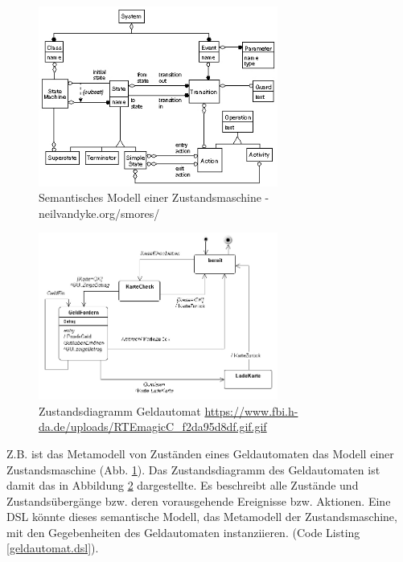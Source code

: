 \documentclass[11pt,english,ngerman, headsepline]{scrreprt}
\begin{document}
 
\begin{figure}[h!]
	\begin{center}
	\includegraphics[width=0.7\textwidth]{pics/data-model.jpg}
	\end{center}
	\caption{Semantisches Modell einer 	Zustandsmaschine
	- neilvandyke.org/smores/ }
	\label{state-machine-semantic-model}
\end{figure}

\begin{figure}[h!]
	\begin{center}
	\includegraphics[width=0.7\textwidth]{pics/zutandsdiaGeldautomat.jpg}
	\end{center}
	\caption{Zustandsdiagramm Geldautomat
	\url{https://www.fbi.h-da.de/uploads/RTEmagicC_f2da95d8df.gif.gif} }
	\label{zutandsdiaGeldautomat.jpg}
\end{figure}

Z.B. ist das Metamodell von Zuständen eines Geldautomaten das Modell einer
Zustandsmaschine (Abb. \ref{state-machine-semantic-model}). Das Zustandsdiagramm
des Geldautomaten ist damit das in Abbildung \ref{zutandsdiaGeldautomat.jpg}
dargestellte. Es beschreibt alle Zustände und Zustandsübergänge bzw. deren
vorausgehende Ereignisse bzw. Aktionen. Eine DSL könnte dieses semantische
Modell, das Metamodell der Zustandsmaschine, mit den Gegebenheiten des
Geldautomaten instanziieren. (Code Listing \ref{geldautomat.dsl}).
   
\end{document}
